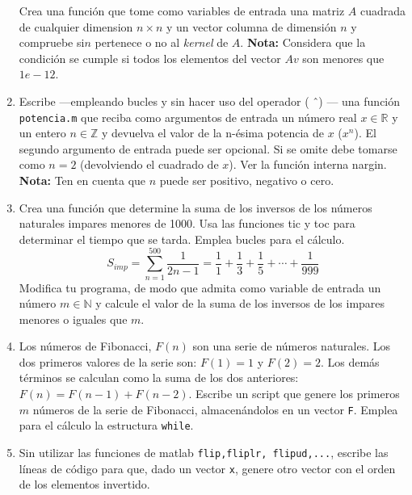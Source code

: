 \begin{enumerate}
Crea una función que tome como variables de entrada una matriz $A$ cuadrada de cualquier dimension $n\times n$ y un vector columna de dimensión $n$ y compruebe si$n$ pertenece o no al \emph{kernel} de $A$. \textbf{Nota:} Considera que la condición se cumple si todos los elementos del vector $Av$ son menores que $1e-12$.

\item Escribe ---empleando bucles y sin hacer uso del operador ( \^\ ) --- una función \verb|potencia.m| que reciba como argumentos de entrada un número real $x\in \mathbb{R}$ y un entero $n \in \mathbb{Z}$ y devuelva el valor de la n-ésima potencia de $x$ ($x^n$). El segundo argumento de entrada puede ser opcional. Si se omite debe tomarse como $n=2$ (devolviendo el cuadrado de $x$). Ver la función interna nargin. \textbf{Nota:} Ten en cuenta que $n$ puede ser positivo, negativo o cero.

\item Crea una función que determine la suma de los inversos de los números naturales impares menores de 1000. Usa las funciones tic y toc para determinar el tiempo que se tarda. Emplea bucles para el cálculo.
\begin{equation*}
S_{imp} = \sum_{n=1}^{500}\frac{1}{2n-1} =\frac{1}{1}+\frac{1}{3}+\frac{1}{5}+\cdots+\frac{1}{999}
\end{equation*}
Modifica tu programa, de modo que admita como variable de entrada un número $m\in\mathbb{N}$ y calcule el valor de la suma de los inversos de los impares menores o iguales que $m$.

\item Los números de Fibonacci, $F(n)$ son una serie de números naturales. Los dos primeros valores de la serie son:  $F(1)=1$ y $F(2)=2$. Los demás términos se calculan como la suma de los dos anteriores: $F(n) = F(n-1) + F(n-2)$.
Escribe un script que genere los primeros $m$ números de la serie de Fibonacci, almacenándolos en un vector \verb|F|. Emplea para el cálculo la estructura \verb|while|.

\item Sin utilizar las funciones de matlab \verb|flip,fliplr, flipud,...|, escribe las líneas de código para que, dado un vector \verb|x|, genere otro vector con el orden de los elementos invertido.
\end{enumerate}

